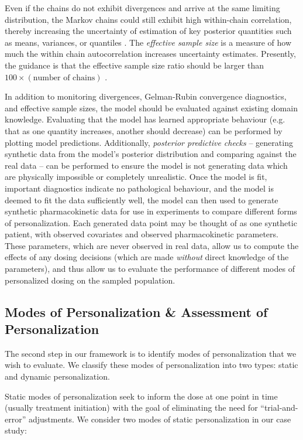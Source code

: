Even if the chains do not exhibit divergences and arrive at the same limiting distribution, the Markov chains could still exhibit high within-chain correlation, thereby increasing the uncertainty of estimation of key posterior quantities such as means, variances, or quantiles \cite{brooks2011handbook}.  The \textit{effective sample size} is a measure of how much the within chain autocorrelation increases uncertainty estimates.  Presently, the guidance is that the effective sample size ratio should be larger than $100 \times (\mbox{number of chains})$ \cite{vehtari2019rank}.


In addition to monitoring divergences, Gelman-Rubin convergence diagnostics, and effective sample sizes, the model should be evaluated against existing domain knowledge.  Evaluating that the model has learned appropriate  behaviour (e.g. that as one quantity increases, another should decrease) can be performed by plotting model predictions.  Additionally, \textit{posterior predictive checks} -- generating synthetic data  from the model's posterior distribution and comparing against the real data -- can be performed to ensure the model is not generating data which are physically impossible or completely unrealistic. Once the model is fit, important diagnostics indicate no pathological behaviour, and the model is deemed to fit the data sufficiently well, the model can then used to generate synthetic pharmacokinetic data for use in experiments to compare different forms of personalization. Each generated data point may be thought of as one synthetic patient, with observed covariates and observed pharmacokinetic parameters. These parameters, which are never observed in real data, allow us to compute the effects of any dosing decisions (which are made \textit{without} direct knowledge of the parameters), and thus allow us to evaluate the performance of different modes of personalized dosing on the sampled population. 

\subsection{Modes of Personalization \& Assessment of Personalization}

The second step in our framework is to identify modes of personalization that we wish to evaluate. We classify these modes of personalization into two types: static and dynamic personalization.

Static modes of personalization seek to inform the dose at one point in time (usually treatment initiation) with the goal of eliminating the need for ``trial-and-error'' adjustments.  We consider two modes of static personalization in our case study:


